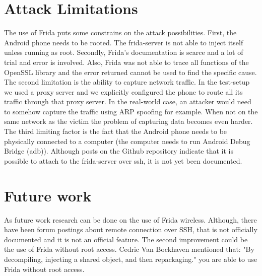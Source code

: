 \documentclass[12pt, a4paper]{report}
\begin{document}
\section{Attack Limitations}
The use of Frida puts some constrains on the attack possibilities. First, the Android phone needs to be rooted. The frida-server is not able to inject itself unless running as root. Secondly, Frida's documentation is scarce and a lot of trial and error is involved. Also, Frida was not able to trace all functions of the OpenSSL library and the error returned cannot be used to find the specific cause.  
\newline
\newline
The second limitation is the ability to capture network traffic. In the test-setup we used a proxy server and we explicitly configured the phone to route all its traffic through that proxy server. In the real-world case, an attacker would need to somehow capture the traffic using ARP spoofing for example. When not on the same network as the victim the problem of capturing data becomes even harder. 
\newline
\newline
The third limiting factor is the fact that the Android phone needs to be physically connected to a computer (the computer needs to run Android Debug Bridge (adb)). Although posts on the Github repository indicate that it is possible to attach to the frida-server over ssh, it is not yet been documented.   


\section{Future work}

As future work research can be done on the use of Frida wireless. Although, there have been forum postings about remote connection over SSH, that is not officially documented and it is not an official feature.
\newline
\newline
The second improvement could be the use of Frida without root access. Cedric Van Bockhaven mentioned that: "By decompiling, injecting a shared object, and then repackaging." you are able to use Frida without root access.





\end{document}

